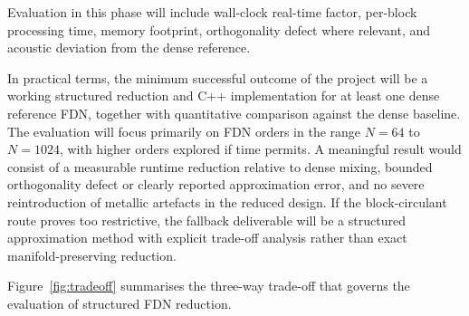 \documentclass[12pt,a4paper]{article}
\begin{document}
Evaluation in this phase will include wall-clock real-time factor, per-block
processing time, memory footprint, orthogonality defect where relevant, and
acoustic deviation from the dense reference.

In practical terms, the minimum successful outcome of the project will be a
working structured reduction and C++ implementation for at least one dense
reference FDN, together with quantitative comparison against the dense baseline.
The evaluation will focus primarily on FDN orders in the range $N=64$ to
$N=1024$, with higher orders explored if time permits. A meaningful result would
consist of a measurable runtime reduction relative to dense mixing, bounded
orthogonality defect or clearly reported approximation error, and no severe
reintroduction of metallic artefacts in the reduced design. If the block-circulant
route proves too restrictive, the fallback deliverable will be a structured
approximation method with explicit trade-off analysis rather than exact
manifold-preserving reduction.

Figure~\ref{fig:tradeoff} summarises the three-way trade-off that governs the evaluation of structured FDN reduction.
\end{document}
